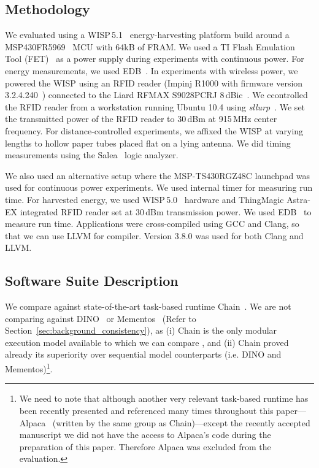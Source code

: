 
\subsection{Methodology}
\label{sec:results_hardware}

We evaluated \sys using a WISP\,5.1~\cite{wisp5,wisp} energy-harvesting
platform build around a MSP430FR5969~\cite{wolverine} MCU with 64kB of FRAM.
We used a TI Flash Emulation Tool (FET)~\cite{fet} as a power supply during
experiments with continuous power.  For energy measurements, we used
EDB~\cite{edb}.  In experiments with wireless power, we powered the WISP using
an RFID reader (Impinj R1000 with firmware version
3.2.4.240~\cite{r1000_data_sheet}) connected to the Liard RFMAX S9028PCRJ
8\,dBic~\cite{atlas2015}. We ccontrolled the RFID reader from a workstation
running Ubuntu 10.4 using \emph{sllurp}~\cite{sllrp_github}.  We set the
transmitted power of the RFID reader to 30\,dBm at 915\,MHz center frequency.
For distance-controlled experiments, we affixed the WISP at varying lengths to
hollow paper tubes placed flat on a lying antenna. We did timing measurements
using the Salea~\cite{saleae} logic analyzer.

We also used an alternative setup where the MSP-TS430RGZ48C launchpad was used
for continuous power experiments. We used internal timer for measuring run
time. For harvested energy, we used WISP\,5.0~\cite{wisp5,wisp} hardware and
ThingMagic Astra-EX integrated RFID reader set at 30\,dBm transmission power.
We used EDB~\cite{edb} to measure run time. Applications were cross-compiled
using GCC and Clang, so that we can use LLVM for \sys compiler. Version 3.8.0
was used for both Clang and LLVM.

\subsection{Software Suite Description}
\label{sec:results_software}

We compare \sys against state-of-the-art task-based runtime Chain~\cite{chain}. We are not comparing \sys against DINO~\cite{dino} or Mementos~\cite{mementos} (Refer to Section~\ref{sec:background_consistency}), as (i) Chain is the only modular execution model available to which we can compare \sys, and (ii) Chain proved already its superiority over sequential model counterparts (i.e. DINO and Mementos)\footnote{We need to note that although another very relevant task-based runtime has been recently presented and referenced many times throughout this paper---Alpaca~\cite{alpaca} (written by the same group as Chain)---except the recently accepted manuscript we did not have the access to Alpaca's code during the preparation of this paper. Therefore Alpaca was excluded from the evaluation.}.


